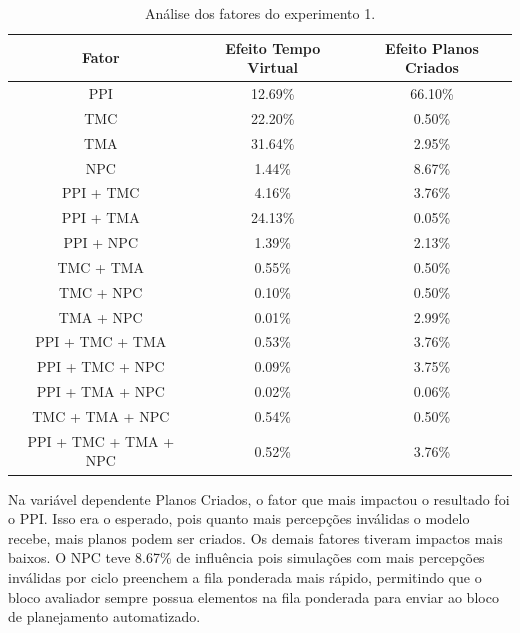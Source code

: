 \begin{table}
    \begin{center}
        \caption{Análise dos fatores do experimento 1.}
        \label{tab:experimento1fatores}
        \begin{tabular}{ |c|c|c| }
            \hline
            \textbf{Fator} & \textbf{Efeito Tempo Virtual} & \textbf{Efeito Planos Criados}\\  
            \hline
            PPI & 12.69\% & 66.10\%\\
            \hline
            TMC & 22.20\% & 0.50\%\\
            \hline
            TMA & 31.64\% & 2.95\%\\
            \hline
            NPC & 1.44\% & 8.67\%\\
            \hline
            PPI + TMC & 4.16\% & 3.76\%\\
            \hline
            PPI + TMA & 24.13\% & 0.05\%\\
            \hline
            PPI + NPC & 1.39\% & 2.13\%\\
            \hline
            TMC + TMA & 0.55\% & 0.50\%\\
            \hline
            TMC + NPC & 0.10\% & 0.50\%\\
            \hline
            TMA + NPC & 0.01\% & 2.99\%\\
            \hline
            PPI + TMC + TMA & 0.53\% & 3.76\%\\
            \hline
            PPI + TMC + NPC & 0.09\% & 3.75\%\\
            \hline
            PPI + TMA + NPC & 0.02\% & 0.06\%\\
            \hline
            TMC + TMA + NPC & 0.54\% & 0.50\%\\
            \hline
            PPI + TMC + TMA + NPC & 0.52\% & 3.76\%\\
            \hline
        \end{tabular}{}
    \end{center}{}
\end{table}


Na variável dependente Planos Criados, o fator que mais impactou o resultado foi o PPI. Isso era o esperado, pois quanto mais percepções inválidas o modelo recebe, mais planos podem ser criados. Os demais fatores tiveram impactos mais baixos. O NPC teve 8.67\% de influência pois simulações com mais percepções inválidas por ciclo preenchem a fila ponderada mais rápido, permitindo que o bloco avaliador sempre possua elementos na fila ponderada para enviar ao bloco de planejamento automatizado.

